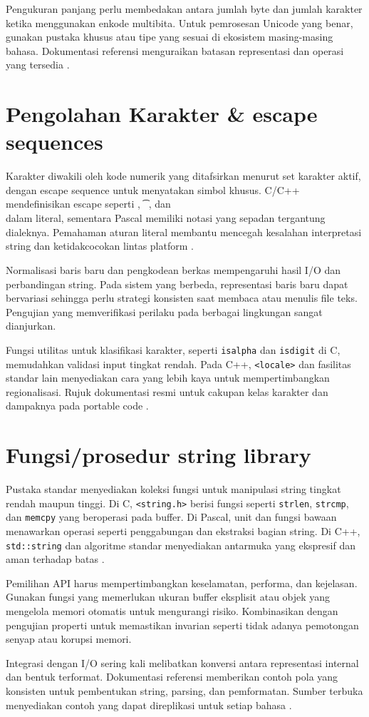 \documentclass[../main.tex]{subfiles}
\begin{document}
Pengukuran panjang perlu membedakan antara jumlah byte dan jumlah karakter ketika menggunakan enkode multibita. Untuk pemrosesan Unicode yang benar, gunakan pustaka khusus atau tipe yang sesuai di ekosistem masing-masing bahasa. Dokumentasi referensi menguraikan batasan representasi dan operasi yang tersedia \parencite{cpp-strings,iso-c-draft-n1570}.

\section{Pengolahan Karakter \& escape sequences}
Karakter diwakili oleh kode numerik yang ditafsirkan menurut set karakter aktif, dengan escape sequence untuk menyatakan simbol khusus. C/C++ mendefinisikan escape seperti \texttt{\n}, \texttt{\t}, dan \texttt{\\} dalam literal, sementara Pascal memiliki notasi yang sepadan tergantung dialeknya. Pemahaman aturan literal membantu mencegah kesalahan interpretasi string dan ketidakcocokan lintas platform \parencite{iso-c-draft-n1570,free-pascal-docs}.

Normalisasi baris baru dan pengkodean berkas mempengaruhi hasil I/O dan perbandingan string. Pada sistem yang berbeda, representasi baris baru dapat bervariasi sehingga perlu strategi konsisten saat membaca atau menulis file teks. Pengujian yang memverifikasi perilaku pada berbagai lingkungan sangat dianjurkan.

Fungsi utilitas untuk klasifikasi karakter, seperti \texttt{isalpha} dan \texttt{isdigit} di C, memudahkan validasi input tingkat rendah. Pada C++, \texttt{<locale>} dan fasilitas standar lain menyediakan cara yang lebih kaya untuk mempertimbangkan regionalisasi. Rujuk dokumentasi resmi untuk cakupan kelas karakter dan dampaknya pada portable code \parencite{iso-c-draft-n1570,cpp-reference}.

\section{Fungsi/prosedur string library}
Pustaka standar menyediakan koleksi fungsi untuk manipulasi string tingkat rendah maupun tinggi. Di C, \texttt{<string.h>} berisi fungsi seperti \texttt{strlen}, \texttt{strcmp}, dan \texttt{memcpy} yang beroperasi pada buffer. Di Pascal, unit dan fungsi bawaan menawarkan operasi seperti penggabungan dan ekstraksi bagian string. Di C++, \texttt{std::string} dan algoritme standar menyediakan antarmuka yang ekspresif dan aman terhadap batas \parencite{c-strings-h,free-pascal-docs,cpp-strings}.

Pemilihan API harus mempertimbangkan keselamatan, performa, dan kejelasan. Gunakan fungsi yang memerlukan ukuran buffer eksplisit atau objek yang mengelola memori otomatis untuk mengurangi risiko. Kombinasikan dengan pengujian properti untuk memastikan invarian seperti tidak adanya pemotongan senyap atau korupsi memori.

Integrasi dengan I/O sering kali melibatkan konversi antara representasi internal dan bentuk terformat. Dokumentasi referensi memberikan contoh pola yang konsisten untuk pembentukan string, parsing, dan pemformatan. Sumber terbuka menyediakan contoh yang dapat direplikasi untuk setiap bahasa \parencite{c-strings-h,cpp-strings,free-pascal-docs}.
\end{document}
